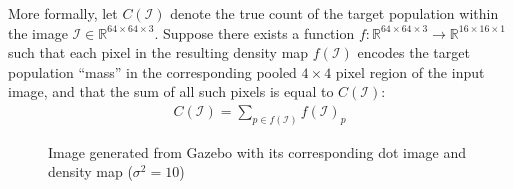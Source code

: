 \documentclass[10pt,twocolumn,letterpaper]{article}
\newcommand{\I}{\mathcal{I}}
\begin{document}
  More formally, let $C(\I)$ denote the true count of the target population
  within the image $\I \in \mathbb{R}^{64 \times 64 \times 3}$. Suppose there
  exists a function $f: \mathbb{R}^{64 \times 64 \times 3} \rightarrow
  \mathbb{R}^{16 \times 16 \times 1}$ such that each pixel in the resulting
  density map $f(\I)$ encodes the target population ``mass'' in the
  corresponding pooled $4 \times 4$ pixel region of the input image, and that
  the sum of all such pixels is equal to $C(\I)$:
  \begin{align}
    C(\I) = \sum_{p \in f(\I)} {f(\I)}_p
  \end{align}

  \begin{figure}
  \begin{center}
  \end{center}
     \caption{Image generated from Gazebo with its corresponding dot image and
     density map ($\sigma^2 = 10$)}
  \label{fig:trainimg}
  \end{figure}
\end{document}

